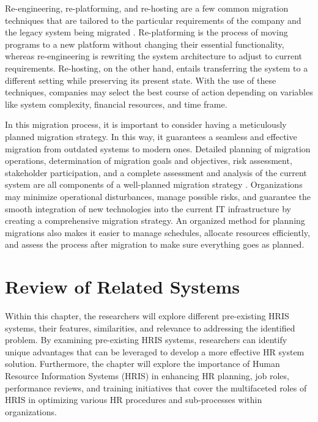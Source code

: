         Re-engineering, re-platforming, and re-hosting are a few common migration techniques that are tailored to the particular requirements of the company and the legacy system being migrated \cite{hrd12020}. Re-platforming is the process of moving programs to a new platform without changing their essential functionality, whereas re-engineering is rewriting the system architecture to adjust to current requirements. Re-hosting, on the other hand, entails transferring the system to a different setting while preserving its present state. With the use of these techniques, companies may select the best course of action depending on variables like system complexity, financial resources, and time frame.
        
        In this migration process, it is important to consider having a meticulously planned migration strategy. In this way, it guarantees a seamless and effective migration from outdated systems to modern ones. Detailed planning of migration operations, determination of migration goals and objectives, risk assessment, stakeholder participation, and a complete assessment and analysis of the current system are all components of a well-planned migration strategy \cite{hrd12021}. Organizations may minimize operational disturbances, manage possible risks, and guarantee the smooth integration of new technologies into the current IT infrastructure by creating a comprehensive migration strategy. An organized method for planning migrations also makes it easier to manage schedules, allocate resources efficiently, and assess the process after migration to make sure everything goes as planned.




\section{Review of Related Systems}
    Within this chapter, the researchers will explore different pre-existing HRIS systems, their features, similarities, and relevance to addressing the identified problem. By examining pre-existing HRIS systems, researchers can identify unique advantages that can be leveraged to develop a more effective HR system solution. Furthermore, the chapter will explore the importance of Human Resource Information Systems (HRIS) in enhancing HR planning, job roles, performance reviews, and training initiatives that cover the multifaceted roles of HRIS in optimizing various HR procedures and sub-processes within organizations.
    
